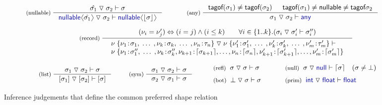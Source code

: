\documentclass[10pt,preprint,blind,clearpagebib]{sigplanconf}
\newcommand{\langl}{\begin{picture}(4.5,7)
\put(1.1,2.5){\rotatebox{60}{\line(1,0){5.5}}}
\put(1.1,2.5){\rotatebox{300}{\line(1,0){5.5}}}
\end{picture}}
\newcommand{\rangl}{\begin{picture}(4.5,7)
\put(.9,2.5){\rotatebox{120}{\line(1,0){5.5}}}
\put(.9,2.5){\rotatebox{240}{\line(1,0){5.5}}}
\end{picture}}
\newcommand{\kvd}[1]{\textnormal{\textcolor{kvdclr}{\sffamily #1}}}
\newcommand{\ident}[1]{\textnormal{\sffamily #1}}
\newcommand{\tsep}[0]{\; \triangledown \;}
\newcommand{\dropopt}[1]{\lfloor#1\rfloor}
\newcommand{\addopt}[1]{\lceil#1\rceil}
\newcommand{\tytagof}{\ident{tagof}}
\begin{document}
\begin{figure}[t]
\vspace{-0.5em}
\begin{equation*}
\inference[(nullable)\;]
  {\hat{\sigma_1} \tsep \sigma_2 \vdash \sigma}
  {\kvd{nullable}\langl\hat{\sigma_1}\rangl \tsep \sigma_2 \vdash \kvd{nullable}\langl\dropopt{\sigma}\rangl}
\qquad
\inference[(any)\;]
  { \tytagof(\sigma_1) \neq \tytagof(\sigma_2) & \tytagof(\sigma_1) \neq \ident{nullable} \neq \tytagof{\sigma_2}}
  { \sigma_1 \tsep \sigma_2 \vdash \kvd{any} }  
\end{equation*}
\vspace{-2em}

\begin{equation*}
\hspace{4em}
\inference[(record)\;]
  { (\nu_i = \nu'_j) \Leftrightarrow (i = j) \wedge (i \leq k)
      \qquad \forall i\in\{ 1 .. k \}.(\sigma_i \tsep \sigma'_i \vdash \sigma''_i) }
  { \begin{array}{l}
    \nu \; \{ \nu_1 \!:\! \sigma_1,  \; \ldots \;, \nu_k \!:\! \sigma_k, \; \ldots \;, \nu_n \!:\! \tau_n \} \tsep
    \nu \; \{ \nu'_1 \!:\! \sigma'_1, \; \ldots \;, \nu'_k \!:\! \sigma'_k, \; \ldots \;, \nu'_m \!:\! \tau'_m \} \vdash\\
    \nu \; \{ \nu_1 \!:\! \sigma''_1, \; \ldots \; , \nu_k \!:\! \sigma''_k, 
                            \nu_{k+1} \!:\! \addopt{\sigma_{k+1}}, \ldots, \nu_n \!:\! \addopt{\sigma_n},
                            \nu'_{k+1} \!:\! \addopt{\sigma'_{k+1}}, \ldots, \nu'_m \!:\! \addopt{\sigma'_m} \}
    \end{array} }
\end{equation*}
\vspace{-2em}

\begin{equation*}
\hspace{2em}
\inference[(list)\;]
  {\sigma_1 \tsep \sigma_2 \vdash \sigma}
  {[\sigma_1] \tsep [\sigma_2] \vdash [\sigma]}
\quad
\inference[(sym)\;]
  {\sigma_1 \tsep \sigma_2 \vdash \sigma}
  {\sigma_2 \tsep \sigma_1 \vdash \sigma}
%
\quad
\begin{array}{l}
 \textnormal{\footnotesize{(refl)}}\;\; \sigma \tsep \sigma \vdash \sigma\\[0.6em]
 \textnormal{\footnotesize{(bot)}}\;\; \bot \tsep \sigma \vdash \sigma
\end{array}
%
\quad
\begin{array}{l}
 \textnormal{\footnotesize{(null)}}\;\; \sigma \tsep \kvd{null} \vdash \addopt{\sigma} \quad (\sigma \neq \bot)\\[0.6em]
 \textnormal{\footnotesize{(prim)}}\;\; \kvd{int} \tsep \kvd{float} \vdash \kvd{float}
\end{array}
\end{equation*}

\caption{Inference judgements that define the common preferred shape relation}
\label{fig:subtyping-cst}
\end{figure}
\end{document}
